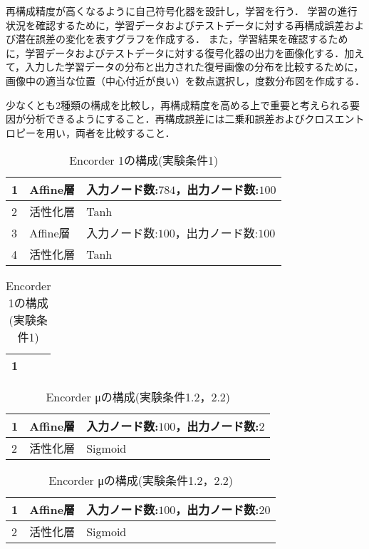 \documentclass[12pt]{jsarticle}
\begin{document}
再構成精度が高くなるように自己符号化器を設計し，学習を行う．
学習の進行状況を確認するために，学習データおよびテストデータに対する再構成誤差および潜在誤差の変化を表すグラフを作成する．
また，学習結果を確認するために，学習データおよびテストデータに対する復号化器の出力を画像化する．加えて，入力した学習データの分布と出力された復号画像の分布を比較するために，画像中の適当な位置（中心付近が良い）を数点選択し，度数分布図を作成する．

少なくとも2種類の構成を比較し，再構成精度を高める上で重要と考えられる要因が分析できるようにすること．再構成誤差には二乗和誤差およびクロスエントロピーを用い，両者を比較すること．
\begin{table}[bt]
\begin{center}
\caption{Encorder 1の構成(実験条件1)}
\label{table:Encorder1-1}
\begin{tabularx}{0.9\linewidth}{|l|l|X|}
\hline
1 & Affine層 & 入力ノード数:$784$，出力ノード数:$100$ \\
\hline
2 & 活性化層 & Tanh \\
\hline
3 & Affine層 & 入力ノード数:$100$，出力ノード数:$100$ \\
\hline
4 & 活性化層 & Tanh
\hline
\end{tabularx}
\end{center}
\end{table}

\begin{table}[bt]
\begin{center}
\caption{Encorder 1の構成(実験条件1)}
\label{table:Encorder1-2}
\begin{tabularx}{0.9\linewidth}{|l|l|X|}
\hline
1 &  &  \\
\hline
\end{tabularx}
\end{center}
\end{table}

\begin{table}[bt]
\begin{center}
\caption{Encorder μの構成(実験条件1.2，2.2)}
\label{table:Encorder mu-1}
\begin{tabularx}{0.9\linewidth}{|l|l|X|}
\hline
1 & Affine層 & 入力ノード数:$100$，出力ノード数:$2$ \\
\hline
2 & 活性化層 & Sigmoid \\
\hline
\end{tabularx}
\end{center}
\end{table}

\begin{table}[bt]
\begin{center}
\caption{Encorder μの構成(実験条件1.2，2.2)}
\label{table:Encorder mu-2}
\begin{tabularx}{0.9\linewidth}{|l|l|X|}
\hline
1 & Affine層 & 入力ノード数:$100$，出力ノード数:$20$ \\
\hline
2 & 活性化層 & Sigmoid \\
\hline
\end{tabularx}
\end{center}
\end{table}
\end{document}
